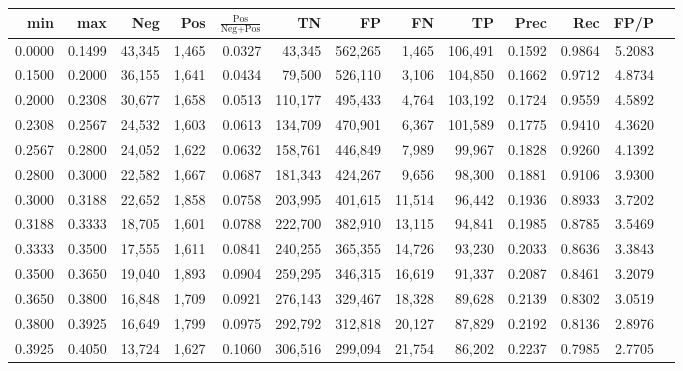 \begin{tabular}{rrrrrrrrrrrrr}
\toprule
   min &    max &    Neg &   Pos & $\frac{\text{Pos}}{\text{Neg}+\text{Pos}}$ &      TN &      FP &      FN &      TP &   Prec &    Rec &   FP/P \\
\midrule
0.0000 & 0.1499 & 43,345 & 1,465 &                                     0.0327 &  43,345 & 562,265 &   1,465 & 106,491 & 0.1592 & 0.9864 & 5.2083 \\
0.1500 & 0.2000 & 36,155 & 1,641 &                                     0.0434 &  79,500 & 526,110 &   3,106 & 104,850 & 0.1662 & 0.9712 & 4.8734 \\
0.2000 & 0.2308 & 30,677 & 1,658 &                                     0.0513 & 110,177 & 495,433 &   4,764 & 103,192 & 0.1724 & 0.9559 & 4.5892 \\
0.2308 & 0.2567 & 24,532 & 1,603 &                                     0.0613 & 134,709 & 470,901 &   6,367 & 101,589 & 0.1775 & 0.9410 & 4.3620 \\
0.2567 & 0.2800 & 24,052 & 1,622 &                                     0.0632 & 158,761 & 446,849 &   7,989 &  99,967 & 0.1828 & 0.9260 & 4.1392 \\
0.2800 & 0.3000 & 22,582 & 1,667 &                                     0.0687 & 181,343 & 424,267 &   9,656 &  98,300 & 0.1881 & 0.9106 & 3.9300 \\
0.3000 & 0.3188 & 22,652 & 1,858 &                                     0.0758 & 203,995 & 401,615 &  11,514 &  96,442 & 0.1936 & 0.8933 & 3.7202 \\
0.3188 & 0.3333 & 18,705 & 1,601 &                                     0.0788 & 222,700 & 382,910 &  13,115 &  94,841 & 0.1985 & 0.8785 & 3.5469 \\
0.3333 & 0.3500 & 17,555 & 1,611 &                                     0.0841 & 240,255 & 365,355 &  14,726 &  93,230 & 0.2033 & 0.8636 & 3.3843 \\
0.3500 & 0.3650 & 19,040 & 1,893 &                                     0.0904 & 259,295 & 346,315 &  16,619 &  91,337 & 0.2087 & 0.8461 & 3.2079 \\
0.3650 & 0.3800 & 16,848 & 1,709 &                                     0.0921 & 276,143 & 329,467 &  18,328 &  89,628 & 0.2139 & 0.8302 & 3.0519 \\
0.3800 & 0.3925 & 16,649 & 1,799 &                                     0.0975 & 292,792 & 312,818 &  20,127 &  87,829 & 0.2192 & 0.8136 & 2.8976 \\
0.3925 & 0.4050 & 13,724 & 1,627 &                                     0.1060 & 306,516 & 299,094 &  21,754 &  86,202 & 0.2237 & 0.7985 & 2.7705 \\

\end{tabular}
